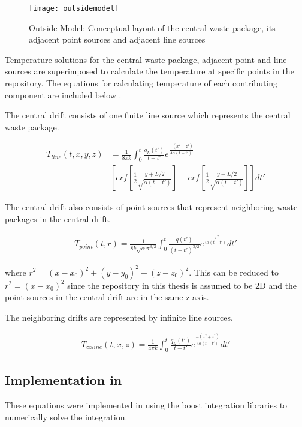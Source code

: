 \begin{figure}[h]
	\texttt{[image: outsidemodel]}
	\caption{Outside Model: Conceptual layout of the central waste 
	package, its adjacent point sources and adjacent line sources 
	\cite{sutton_investigations_2011}}
    \label{fig:conceptual_layout}
\end{figure}

Temperature solutions for the central waste package, adjacent point
and line sources are superimposed to calculate the temperature at 
specific points in the repository.
The equations for calculating temperature of each contributing 
component are included below \cite{sutton_investigations_2011,
greenberg_application_2012,huff_numerical_2012}. 

The central drift consists of one finite line source which 
represents the central waste package. 

\begin{align}
	T_{line}(t,x,y,z) &= \frac{1}{8 \pi k}  \int_{0}^{t} 
	\frac{q_L(t')}{t-t'}e^{\frac{-(x^2+z^2)}{4\alpha(t-t')}} \\
	&[erf[\frac{1}{2}\frac{y+L/2}{\sqrt{\alpha(t-t')}}]-
	erf[\frac{1}{2}\frac{y-L/2}{\sqrt{\alpha(t-t')}}]] dt'
\end{align}

The central drift also consists of point sources that represent 
neighboring waste packages in the central drift. 

\begin{align}
	T_{point}(t,r) = \frac{1}{8 k \sqrt{\alpha} \pi^{3/2}} 
	\int_{0}^{t}\frac{q(t')}{(t-t')^{3/2}}e^{\frac{-r^2}
	{4\alpha(t-t')}}dt'
\end{align}

where $r^2 = (x-x_0)^2 + (y-y_0)^2 + (z-z_0)^2$. 
This can be reduced to $r^2 = (x-x_0)^2$ since the repository in 
this thesis is assumed to be 2D and the point sources in the central 
drift are in the same z-axis.  

The neighboring drifts are represented by infinite line sources.  

\begin{align}
	T_{\infty line}(t,x,z) = \frac{1}{4\pi k} \int_0^t 
	\frac{q_L(t')}{t-t'} e^{\frac{-(x^2+z^2)}{4\alpha (t-t')}} dt'
\end{align}

\subsection{Implementation in \Cyclus}
These equations were implemented in \Cyclus using the boost 
integration libraries to numerically solve the integration.  
